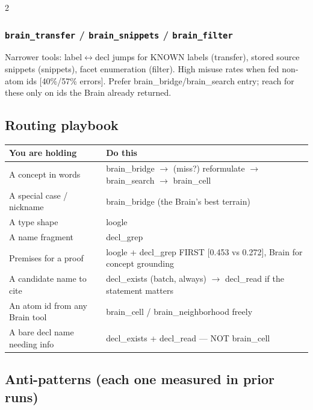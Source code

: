 \documentclass[10pt]{article}
\newcommand{\code}[1]{\texttt{#1}}
\begin{document}
{\begin{multicols}{2}
\subsubsection{\code{brain\_transfer} / \code{brain\_snippets} /
\code{brain\_filter}}
Narrower tools: label$\leftrightarrow$decl jumps for KNOWN labels
(transfer), stored source snippets (snippets), facet enumeration (filter).
High misuse rates when fed non-atom ids [40\%/57\% errors]. Prefer
brain\_bridge/brain\_search entry; reach for these only on ids the Brain
already returned.

\subsection{Routing playbook}

\begin{center}
\begin{tabular}{@{}p{}p{}@{}}
\toprule
You are holding & Do this \\
\midrule
A concept in words & brain\_bridge $\to$ (miss?) reformulate $\to$
  brain\_search $\to$ brain\_cell \\
A special case / nickname & brain\_bridge (the Brain's best terrain) \\
A type shape & loogle \\
A name fragment & decl\_grep \\
Premises for a proof & loogle + decl\_grep FIRST [0.453 vs 0.272], Brain
  for concept grounding \\
A candidate name to cite & decl\_exists (batch, always) $\to$ decl\_read
  if the statement matters \\
An atom id from any Brain tool & brain\_cell / brain\_neighborhood freely \\
A bare decl name needing info & decl\_exists + decl\_read --- NOT
  brain\_cell \\
\bottomrule
\end{tabular}
\end{center}

\subsection{Anti-patterns (each one measured in prior runs)}


\end{multicols}}
\end{document}

